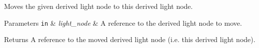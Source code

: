 Moves the given derived light node to this derived light node.


\begin{DoxyParams}[1]{Parameters}
\mbox{\tt in}  & {\em light\+\_\+node} & A reference to the derived light node to move. \\
\hline
\end{DoxyParams}
\begin{DoxyReturn}{Returns}
A reference to the moved derived light node (i.\+e. this derived light node). 
\end{DoxyReturn}
